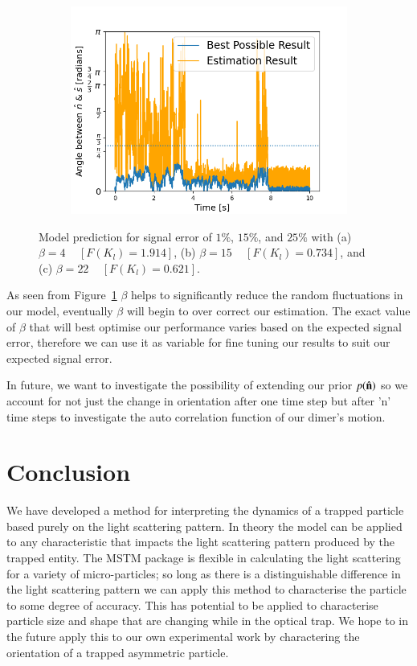 \documentclass[final,  3p]{elsarticle}
\begin{document}
\begin{figure}[h]
\begin{subfigure}{0.32\textwidth}
		\includegraphics[width=\textwidth]{./Images/fig7c.png}
	\end{subfigure}
	\caption{Model prediction for signal error of $1\%$, $15\%$, and $25\%$ with (a) $\beta=4$ ~ $[F(K_l)=1.914]$, (b) $\beta=15$ ~  $[F(K_l)=0.734]$, and (c) $\beta=22$ ~ $[F(K_l)=0.621]$.} 
	\label{fig:beta}
\end{figure}

As seen from Figure~\ref{fig:beta} $\beta$ helps to significantly reduce the random fluctuations in our model, eventually $\beta$ will begin to over correct our estimation. The exact value of $\beta$ that will best optimise our performance varies based on the expected signal error, therefore we can use it as variable for fine tuning our results to suit our expected signal error. 

In future, we want to investigate the possibility of extending our prior $p(\hat{\bf n})$ so we account for not just the change in orientation after one time step but after 'n' time steps to investigate the auto correlation function of our dimer's motion.

\section{Conclusion}
\label{sec:Conclusion}

We have developed a method for interpreting the dynamics of a trapped particle based purely on the light scattering pattern. In theory the model can be applied to any characteristic that impacts the light scattering pattern produced by the trapped entity. The MSTM package is flexible in calculating the light scattering for a variety of micro-particles; so long as there is a distinguishable difference in the light scattering pattern we can apply this method to characterise the particle to some degree of accuracy. This has potential to be applied to characterise particle size and shape that are changing while in the optical trap. We hope to in the future apply this to our own experimental work by charactering the orientation of a trapped asymmetric particle.\\
\end{document}
